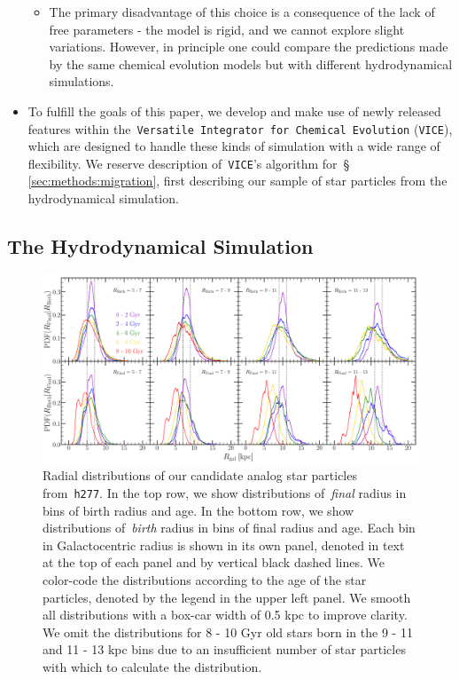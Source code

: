 \documentclass[fleqn, usenatbib]{mnras}
\begin{document}
\begin{itemize}
\begin{itemize}
		\item The primary disadvantage of this choice is a consequence of the 
		lack of free parameters - the model is rigid, and we cannot explore 
		slight variations. However, in principle one could compare the 
		predictions made by the same chemical evolution models but with 
		different hydrodynamical simulations. 
	\end{itemize} 

	\item To fulfill the goals of this paper, we develop and make use of 
	newly released features within the~\texttt{Versatile Integrator for 
	Chemical Evolution} (\texttt{VICE}), which are designed to handle these 
	kinds of simulation with a wide range of flexibility. We reserve 
	description of~\texttt{VICE}'s algorithm for~\S 
	\ref{sec:methods:migration}, first describing our sample of star 
	particles from the hydrodynamical simulation. 
\end{itemize} 

\subsection{The Hydrodynamical Simulation} 
\label{sec:methods:h277} 

\begin{figure} 
\centering 
\includegraphics[scale = 0.32]{decomposition.pdf} 
\caption{Radial distributions of our candidate analog star particles 
from~\texttt{h277}. In the top row, we show distributions of~\textit{final} 
radius in bins of birth radius and age. In the bottom row, we show 
distributions of~\textit{birth} radius in bins of final radius and age. Each 
bin in Galactocentric radius is shown in its own panel, denoted in text at the 
top of each panel and by vertical black dashed lines. We color-code the 
distributions according to the age of the star particles, denoted by the 
legend in the upper left panel. We smooth all distributions with a box-car 
width of 0.5 kpc to improve clarity. We omit the distributions for 8 - 10 Gyr 
old stars born in the 9 - 11 and 11 - 13 kpc bins due to an insufficient 
number of star particles with which to calculate the distribution. }
\label{fig:h277_decomposition} 
\end{figure} 
\end{document}
